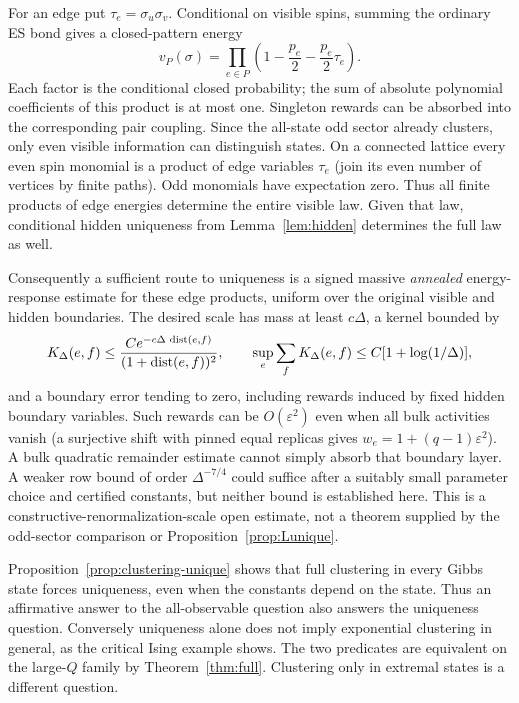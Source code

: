 \begin{remark}\label{rem:energy}
For an edge put $\tau_e=\sigma_u\sigma_v$. Conditional on visible spins, summing the ordinary ES bond gives a closed-pattern energy
\[
 v_P(\sigma)=\prod_{e\in P}\left(1-\frac{p_e}{2}
                                      -\frac{p_e}{2}\tau_e\right).
\]
Each factor is the conditional closed probability; the sum of absolute polynomial coefficients of this product is at most one. Singleton rewards can be absorbed into the corresponding pair coupling. Since the all-state odd sector already clusters, only even visible information can distinguish states. On a connected lattice every even spin monomial is a product of edge variables $\tau_e$ (join its even number of vertices by finite paths). Odd monomials have expectation zero. Thus all finite products of edge energies determine the entire visible law. Given that law, conditional hidden uniqueness from Lemma~\ref{lem:hidden} determines the full law as well.

Consequently a sufficient route to uniqueness is a signed massive \emph{annealed} energy-response estimate for these edge products, uniform over the original visible and hidden boundaries. The desired scale has mass at least $c\Delta$, a kernel bounded by
\[
 K_\Delta(e,f)\le
 \frac{C e^{-c\Delta\,\operatorname{dist}(e,f)}}{(1+\operatorname{dist}(e,f))^2},
 \qquad
 \sup_e\sum_f K_\Delta(e,f)\le C[1+\log(1/\Delta)],
\]
and a boundary error tending to zero, including rewards induced by fixed hidden boundary variables. Such rewards can be $O(\varepsilon^2)$ even when all bulk activities vanish (a surjective shift with pinned equal replicas gives $w_e=1+(q-1)\varepsilon^2$). A bulk quadratic remainder estimate cannot simply absorb that boundary layer. A weaker row bound of order $\Delta^{-7/4}$ could suffice after a suitably small parameter choice and certified constants, but neither bound is established here. This is a constructive-renormalization-scale open estimate, not a theorem supplied by the odd-sector comparison or Proposition~\ref{prop:Lunique}.
\end{remark}


\begin{remark}
Proposition~\ref{prop:clustering-unique} shows that full clustering in every Gibbs state forces uniqueness, even when the constants depend on the state. Thus an affirmative answer to the all-observable question also answers the uniqueness question. Conversely uniqueness alone does not imply exponential clustering in general, as the critical Ising example shows. The two predicates are equivalent on the large-$Q$ family by Theorem~\ref{thm:full}. Clustering only in extremal states is a different question.
\end{remark}

